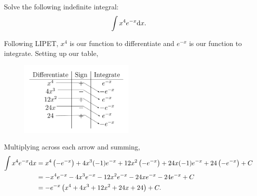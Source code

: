 \begin{example}
	Solve the following indefinite integral:
	\begin{equation*}
		\int{x^4e^{-x}\mathrm{d} x}.
	\end{equation*}
\end{example}
Following LIPET, $x^4$ is our function to differentiate and $e^{-x}$ is our function to integrate.
Setting up our table,
\begin{figure}[H]
	\label{tabular}
	\centering
	\includegraphics[width = 0.5\textwidth]{./integrals/integration_by_parts/tabular.png}
\end{figure}
Multiplying across each arrow and summing,
\begin{align*}
	\int{x^4e^{-x}\mathrm{d} x} &= x^4\left(-e^{-x}\right) + 4x^3(-1)e^{-x} + 12x^2\left(-e^{-x}\right) + 24x(-1)e^{-x} + 24\left(-e^{-x}\right) + C \\
	&= -x^4e^{-x} - 4x^3e^{-x} - 12x^2e^{-x} - 24xe^{-x} - 24e^{-x} + C \\
	&= -e^{-x}\left(x^4 + 4x^3 + 12x^2 + 24x + 24\right) + C.
\end{align*}